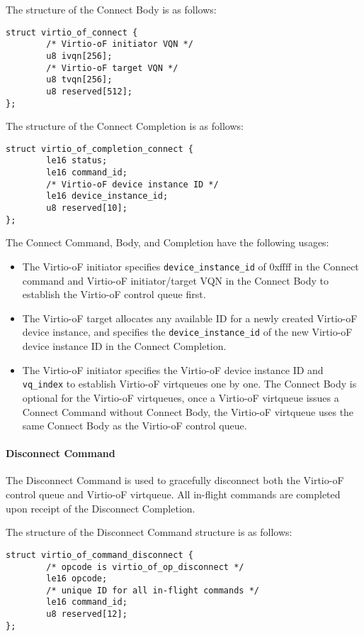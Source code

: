 The structure of the Connect Body is as follows:
\begin{lstlisting}
struct virtio_of_connect {
        /* Virtio-oF initiator VQN */
        u8 ivqn[256];
        /* Virtio-oF target VQN */
        u8 tvqn[256];
        u8 reserved[512];
};
\end{lstlisting}

The structure of the Connect Completion is as follows:
\begin{lstlisting}
struct virtio_of_completion_connect {
        le16 status;
        le16 command_id;
        /* Virtio-oF device instance ID */
        le16 device_instance_id;
        u8 reserved[10];
};
\end{lstlisting}

The Connect Command, Body, and Completion have the following usages:
\begin{itemize}
\item The Virtio-oF initiator specifies \texttt{device_instance_id} of 0xffff in the Connect command
and Virtio-oF initiator/target VQN in the Connect Body to establish the Virtio-oF control queue first.
\item The Virtio-oF target allocates any available ID for a newly created Virtio-oF device instance,
and specifies the \texttt{device_instance_id} of the new Virtio-oF device instance ID in the Connect Completion.
\item The Virtio-oF initiator specifies the Virtio-oF device instance ID and \texttt{vq_index} to establish Virtio-oF virtqueues one by one.
The Connect Body is optional for the Virtio-oF virtqueues, once a Virtio-oF virtqueue issues a Connect Command without Connect Body, the Virtio-oF virtqueue uses the same Connect Body as the Virtio-oF control queue.
\end{itemize}

\paragraph{Disconnect Command}\label{sec:Virtio Transport Options / Virtio Over Fabrics / Commands Definition / Opcodes / Disconnect Command}

The Disconnect Command is used to gracefully disconnect both the Virtio-oF control queue and Virtio-oF virtqueue. All in-flight commands are completed upon receipt of the Disconnect Completion.

The structure of the Disconnect Command structure is as follows:
\begin{lstlisting}
struct virtio_of_command_disconnect {
        /* opcode is virtio_of_op_disconnect */
        le16 opcode;
        /* unique ID for all in-flight commands */
        le16 command_id;
        u8 reserved[12];
};
\end{lstlisting}

